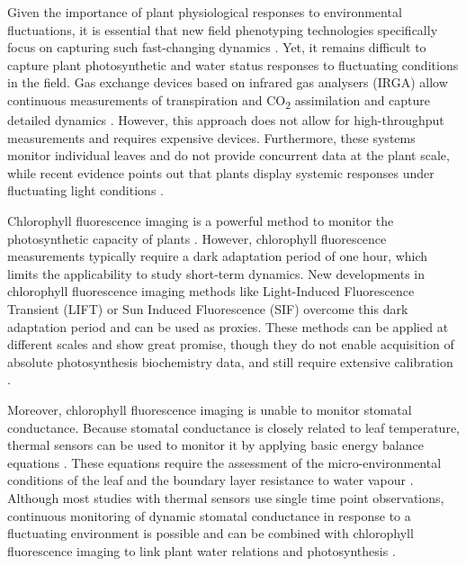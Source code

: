 \documentclass[10pt,authoryear,a4paper]{elsarticle}
\begin{document}
    Given the importance of plant physiological responses to environmental fluctuations,  it is essential that new field phenotyping technologies specifically focus on capturing such fast-changing dynamics \citep{murchieMeasuring2018}. Yet, it remains difficult to capture plant photosynthetic and water status responses to fluctuating conditions in the field. Gas exchange devices based on infrared gas analysers (IRGA) allow continuous measurements of transpiration and CO\textsubscript{2} assimilation and capture detailed dynamics \citep{kromdijkImproving2016}. However, this approach does not allow for high-throughput measurements and requires expensive devices. Furthermore, these systems monitor individual leaves and do not provide concurrent data at the plant scale, while recent evidence points out that plants display systemic responses under fluctuating light conditions \citep{shimadzuWhole2019}. 
    
    Chlorophyll fluorescence imaging is a powerful method to monitor the photosynthetic capacity of plants \citep{bakerChlorophyll2008,murchieChlorophyll2013}. However, chlorophyll fluorescence measurements typically require a dark adaptation period of one hour, which limits the applicability to study short-term dynamics. New developments in chlorophyll fluorescence imaging methods like Light-Induced Fluorescence Transient (LIFT) or Sun Induced Fluorescence (SIF) overcome this dark adaptation period and can be used as proxies. These methods can be applied at different scales and show great promise, though they do not enable acquisition of absolute photosynthesis biochemistry data, and still require extensive calibration \citep{murchieDynamic2020,bandopadhyayReview2020}.
    
    Moreover, chlorophyll fluorescence imaging is unable to monitor stomatal conductance. Because stomatal conductance is closely related to leaf temperature, thermal sensors can be used to monitor it by applying basic energy balance equations \citep{jonesIrrigation2004,maesEstimating2012}. These equations require the assessment of the micro-environmental conditions of the leaf and the boundary layer resistance to water vapour \citep{jonesUse2002}. Although most studies with thermal sensors use single time point observations, continuous monitoring of dynamic stomatal conductance in response to a fluctuating environment is possible and can be combined with chlorophyll fluorescence imaging to link plant water relations and photosynthesis \citep{mcauslandEffects2016}. 
    
\end{document}
